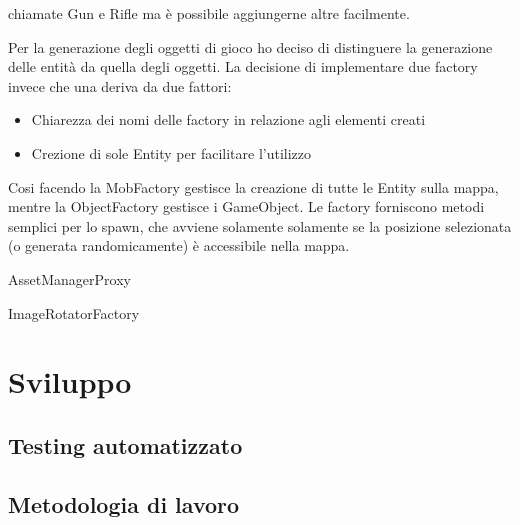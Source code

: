 \documentclass[a4paper,12pt]{report}
\begin{document}
    chiamate Gun e Rifle ma è possibile aggiungerne altre facilmente.
    \par Per la generazione degli oggetti di gioco ho deciso di distinguere la generazione delle entità da quella degli oggetti.
    La decisione di implementare due factory invece che una deriva da due fattori:
    \begin{itemize}
        \item Chiarezza dei nomi delle factory in relazione agli elementi creati
        \item Crezione di sole Entity per facilitare l'utilizzo
    \end{itemize}
    Cosi facendo la MobFactory gestisce la creazione di tutte le Entity sulla mappa, mentre la ObjectFactory gestisce i GameObject.
    Le factory forniscono metodi semplici per lo spawn, che avviene solamente solamente se la posizione selezionata (o generata randomicamente) è accessibile
    nella mappa.

    \par AssetManagerProxy
    \par ImageRotatorFactory

    \chapter{Sviluppo}
    \section{Testing automatizzato}
    \section{Metodologia di lavoro}
\end{document}
